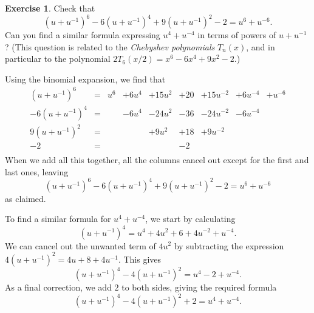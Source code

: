 \documentclass[a4paper]{book}
\newcommand{\PURPLE}[1]{{\color{purple}#1}}
\renewcommand{\:}{\colon}
\newcommand{\mathworld}[1]{}
\newcommand{\DEFN}[1]{\PURPLE{\emph{#1}}}
\theoremstyle{definition}
\newtheorem{exercise}[theorem]{Exercise}
\renewenvironment{solution}{\SolutionInline}{\endSolutionInline}
\begin{document}
\begin{exercise}
 Check that
 \[ (u+u^{-1})^6 - 6(u+u^{-1})^4 + 9(u+u^{-1})^2 - 2 =
      u^6 + u^{-6}.
 \]
 Can you find a similar formula expressing $u^4+u^{-4}$ in terms of
 powers of $u+u^{-1}$?  (This question is related to the
 \DEFN{Chebyshev polynomials}
 \mathworld{ChebyshevPolynomialoftheFirstKind} $T_n(x)$, and in
 particular to the polynomial $2T_6(x/2)=x^6-6x^4+9x^2-2$.)
\end{exercise}
\begin{solution}
 Using the binomial expansion, we find that
 \[ \begin{array}{rclllllll}
  (u+u^{-1})^6  &=& u^6& +6u^4& +15u^2& +20& +15u^{-2}& +6u^{-4}& +u^{-6}\\
  -6(u+u^{-1})^4&=&    & -6u^4& -24u^2& -36& -24u^{-2}& -6u^{-4}& \\
  9(u+u^{-1})^2 &=&    &      &  +9u^2& +18& +9u^{-2} &         & \\
  -2            &=&    &      &       & -2 &          &         & \\
 \end{array} \]
 When we add all this together, all the columns cancel out except for
 the first and last ones, leaving
 \[ (u+u^{-1})^6 - 6(u+u^{-1})^4 + 9(u+u^{-1})^2 - 2 =
      u^6 + u^{-6}
 \]
 as claimed.

 To find a similar formula for $u^4+u^{-4}$, we start by calculating
 \[ (u+u^{-1})^4 = u^4 + 4u^2 + 6 + 4u^{-2} + u^{-4}. \]
 We can cancel out the unwanted term of $4u^2$ by subtracting the
 expression $4(u+u^{-1})^2=4u+8+4u^{-1}$.  This gives
 \[ (u+u^{-1})^4 - 4(u+u^{-1})^2 = u^4 -2 + u^{-4}. \]
 As a final correction, we add $2$ to both sides, giving the required
 formula
 \[ (u+u^{-1})^4 - 4(u+u^{-1})^2 + 2 = u^4 + u^{-4}. \]
\end{solution}
\end{document}
